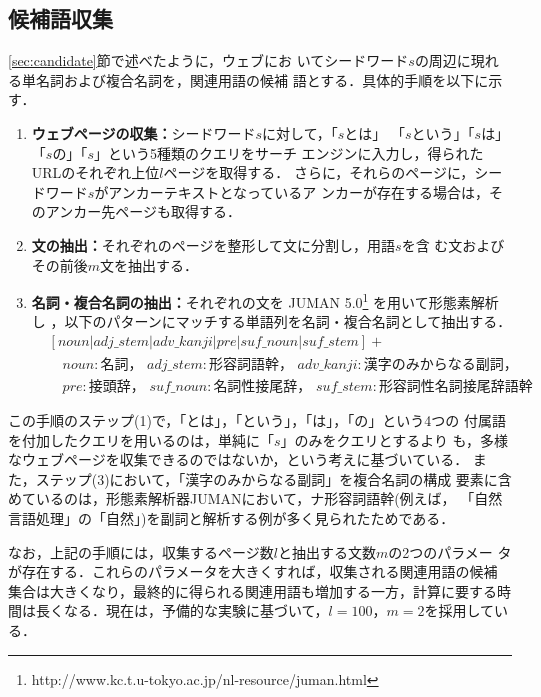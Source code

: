 \subsection{候補語収集}\label{sec:cand_collect}

\mbox{\ref{sec:candidate}}節で述べたように，ウェブにお
いてシードワード$s$の周辺に現れる単名詞および複合名詞を，関連用語の候補
語とする．具体的手順を以下に示す．

\begin{enumerate}
 \item {\bf ウェブページの収集：}シードワード$s$に対して，「$s$とは」
       「$s$という」「$s$は」「$s$の」「$s$」という5種類のクエリをサーチ
       エンジンに入力し，得られたURLのそれぞれ上位$l$ページを取得する．
       さらに，それらのページに，シードワード$s$がアンカーテキストとなっているア
       ンカーが存在する場合は，そのアンカー先ページも取得する．
 \item {\bf 文の抽出：}それぞれのページを整形して文に分割し，用語$s$を含
		      む文およびその前後$m$文を抽出する．
 \item {\bf 名詞・複合名詞の抽出：}それぞれの文を
	JUMAN 5.0\footnote{http://www.kc.t.u-tokyo.ac.jp/nl-resource/juman.html}
	を用いて形態素解析し
       ，以下のパターンにマッチする単語列を名詞・複合名詞として抽出する．
\begin{align*}
 &[noun|adj\_stem|adv\_kanji|pre|suf\_noun|suf\_stem]+\\ 
 &\quad noun: \textrm{名詞， } adj\_stem: \textrm{形容詞語幹， }
  adv\_kanji: \textrm{漢字のみからなる副詞， }\\
 &\quad pre: \textrm{接頭辞， } suf\_noun: \textrm{名詞性接尾辞， }
 suf\_stem: \textrm{形容詞性名詞接尾辞語幹}
\end{align*}
\end{enumerate}

この手順のステップ(1)で，「とは」，「という」，「は」，「の」という4つの
付属語を付加したクエリを用いるのは，単純に「$s$」のみをクエリとするより
も，多様なウェブページを収集できるのではないか，という考えに基づいている．
また，ステップ(3)において，「漢字のみからなる副詞」を複合名詞の構成
要素に含めているのは，形態素解析器JUMANにおいて，ナ形容詞語幹(例えば，
「自然言語処理」の「自然」)を副詞と解析する例が多く見られたためである．

なお，上記の手順には，収集するページ数$l$と抽出する文数$m$の2つのパラメー
タが存在する．これらのパラメータを大きくすれば，収集される関連用語の候補
集合は大きくなり，最終的に得られる関連用語も増加する一方，計算に要する時
間は長くなる．現在は，予備的な実験に基づいて，$l=100$，$m=2$を採用してい
る．


